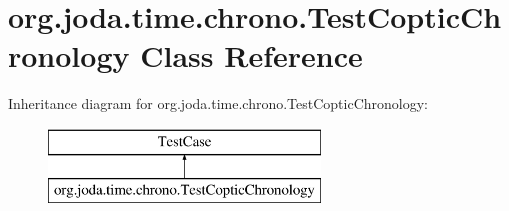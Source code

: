 \hypertarget{classorg_1_1joda_1_1time_1_1chrono_1_1_test_coptic_chronology}{\section{org.\-joda.\-time.\-chrono.\-Test\-Coptic\-Chronology Class Reference}
\label{classorg_1_1joda_1_1time_1_1chrono_1_1_test_coptic_chronology}
}
Inheritance diagram for org.\-joda.\-time.\-chrono.\-Test\-Coptic\-Chronology\-:\begin{figure}[H]
\begin{center}
\leavevmode
\includegraphics[height=2.000000cm]{classorg_1_1joda_1_1time_1_1chrono_1_1_test_coptic_chronology}
\end{center}
\end{figure}
